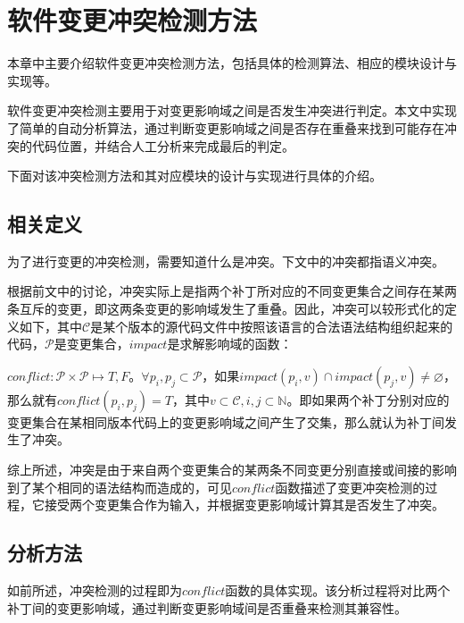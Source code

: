 \chapter{软件变更冲突检测方法}
\label {chap_conflict}

本章中主要介绍软件变更冲突检测方法，包括具体的检测算法、相应的模块设计与实现等。

软件变更冲突检测主要用于对变更影响域之间是否发生冲突进行判定。本文中实现了简单的自动分析算法，通过判断变更影响域之间是否存在重叠来找到可能存在冲突的代码位置，并结合人工分析来完成最后的判定。

下面对该冲突检测方法和其对应模块的设计与实现进行具体的介绍。

\section{相关定义}

\label {conflict_define}

为了进行变更的冲突检测，需要知道什么是冲突。下文中的冲突都指语义冲突。

根据前文中的讨论，冲突实际上是指两个补丁所对应的不同变更集合之间存在某两条互斥的变更，即这两条变更的影响域发生了重叠。因此，冲突可以较形式化的定义如下，其中$\mathcal{C}$是某个版本的源代码文件中按照该语言的合法语法结构组织起来的代码，$\mathcal{P}$是变更集合，$impact$是求解影响域的函数：

\begin{definition}
	$conflict:\mathcal{P} \times \mathcal{P} \mapsto {T,F}$。$\forall p_i,p_j \subset \mathcal{P}$，如果$impact(p_i,v) \cap impact(p_j,v) \neq \varnothing$，那么就有$conflict(p_i,p_j) = T$，其中$v \subset \mathcal{C},i,j \subset \mathbb{N}$。即如果两个补丁分别对应的变更集合在某相同版本代码上的变更影响域之间产生了交集，那么就认为补丁间发生了冲突。
\end{definition}

综上所述，冲突是由于来自两个变更集合的某两条不同变更分别直接或间接的影响到了某个相同的语法结构而造成的，可见$conflict$函数描述了变更冲突检测的过程，它接受两个变更集合作为输入，并根据变更影响域计算其是否发生了冲突。

\section{分析方法}
\label {chap_conflict}

如前所述，冲突检测的过程即为$conflict$函数的具体实现。该分析过程将对比两个补丁间的变更影响域，通过判断变更影响域间是否重叠来检测其兼容性。

